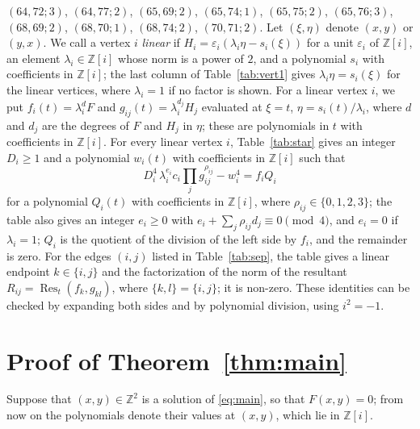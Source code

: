 \documentclass[11pt]{article}
\newcommand{\Z}{\mathbb{Z}}
\begin{document}
$(64,72;3)$, $(64,77;2)$, $(65,69;2)$, $(65,74;1)$, $(65,75;2)$, $(65,76;3)$, $(68,69;2)$, $(68,70;1)$, $(68,74;2)$, $(70,71;2)$.
Let $(\xi,\eta)$ denote $(x,y)$ or $(y,x)$. We call a vertex $i$ \emph{linear} if $H_i=\varepsilon_i(\lambda_i\eta-s_i(\xi))$ for a unit $\varepsilon_i$ of $\Z[i]$, an element $\lambda_i\in\Z[i]$ whose norm is a power of $2$, and a polynomial $s_i$ with coefficients in $\Z[i]$; the last column of Table~\ref{tab:vert1} gives $\lambda_i\eta=s_i(\xi)$ for the linear vertices, where $\lambda_i=1$ if no factor is shown. For a linear vertex $i$, we put $f_i(t)=\lambda_i^{d}F$ and $g_{ij}(t)=\lambda_i^{d_j}H_j$ evaluated at $\xi=t$, $\eta=s_i(t)/\lambda_i$, where $d$ and $d_j$ are the degrees of $F$ and $H_j$ in $\eta$; these are polynomials in $t$ with coefficients in $\Z[i]$.
For every linear vertex $i$, Table~\ref{tab:star} gives an integer $D_i\geq1$ and a polynomial $w_i(t)$ with coefficients in $\Z[i]$ such that
\begin{equation}\label{eq:starlin}
D_i^4\,\lambda_i^{e_i}c_i\prod_jg_{ij}^{\rho_{ij}}-w_i^4=f_iQ_i
\end{equation}
for a polynomial $Q_i(t)$ with coefficients in $\Z[i]$, where $\rho_{ij}\in\{0,1,2,3\}$; the table also gives an integer $e_i\geq0$ with $e_i+\sum_j\rho_{ij}d_j\equiv0\pmod4$, and $e_i=0$ if $\lambda_i=1$; $Q_i$ is the quotient of the division of the left side by $f_i$, and the remainder is zero.
For the edges $(i,j)$ listed in Table~\ref{tab:sep}, the table gives a linear endpoint $k\in\{i,j\}$ and the factorization of the norm of the resultant $R_{ij}=\operatorname{Res}_t(f_k,g_{kl})$, where $\{k,l\}=\{i,j\}$; it is non-zero.
These identities can be checked by expanding both sides and by polynomial division, using $i^2=-1$.

\section{Proof of Theorem~\ref{thm:main}}

Suppose that $(x,y)\in\Z^2$ is a solution of \eqref{eq:main}, so that $F(x,y)=0$; from now on the polynomials denote their values at $(x,y)$, which lie in $\Z[i]$.
\end{document}
